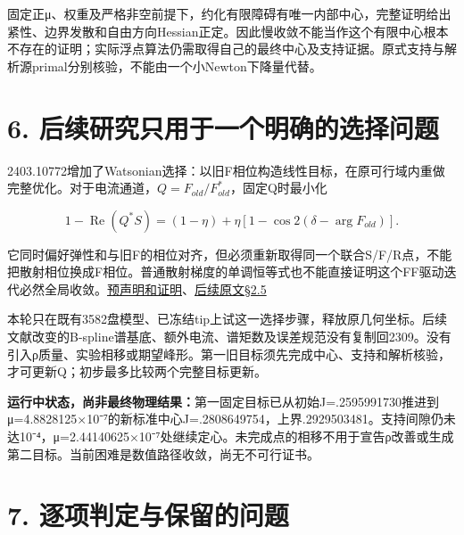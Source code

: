 \documentclass[
  10pt,
  a4paper,
]{article}
\begin{document}
固定正μ、权重及严格非空前提下，约化有限障碍有唯一内部中心，完整证明给出紧性、边界发散和自由方向Hessian正定。因此慢收敛不能当作这个有限中心根本不存在的证明；实际浮点算法仍需取得自己的最终中心及支持证据。原式支持与解析源primal分别核验，不能由一个小Newton下降量代替。

\section{6.
后续研究只用于一个明确的选择问题}\label{ux540eux7eedux7814ux7a76ux53eaux7528ux4e8eux4e00ux4e2aux660eux786eux7684ux9009ux62e9ux95eeux9898}

2403.10772增加了Watsonian选择：以旧F相位构造线性目标，在原可行域内重做完整优化。对于电流通道，\(Q=F_{old}/F_{old}^*\)，固定Q时最小化

\[1-\operatorname{Re}(Q^*S)=(1-\eta)+\eta[1-\cos2(\delta-\arg F_{old})].\]

它同时偏好弹性和与旧F的相位对齐，但必须重新取得同一个联合S/F/R点，不能把散射相位换成F相位。普通散射梯度的单调恒等式也不能直接证明这个FF驱动迭代必然全局收敛。\href{../../../evidence/WATSONIAN_DIAGNOSTIC_SCOPE_20260911.md}{预声明和证明}、\href{https://arxiv.org/html/2403.10772v4\#S2.SS5}{后续原文§2.5}

本轮只在既有3582盘模型、已冻结tip上试这一选择步骤，释放原几何坐标。后续文献改变的B-spline谱基底、额外电流、谱矩数及误差规范没有复制回2309。没有引入ρ质量、实验相移或期望峰形。第一旧目标须先完成中心、支持和解析核验，才可更新Q；初步最多比较两个完整目标更新。

\textbf{运行中状态，尚非最终物理结果：}第一固定目标已从初始J=.2595991730推进到μ=4.8828125×10⁻⁷的新标准中心J=.2808649754，上界.2929503481。支持间隙仍未达10⁻⁴，μ=2.44140625×10⁻⁷处继续定心。未完成点的相移不用于宣告ρ改善或生成第二目标。当前困难是数值路径收敛，尚无不可行证书。

\section{7.
逐项判定与保留的问题}\label{ux9010ux9879ux5224ux5b9aux4e0eux4fddux7559ux7684ux95eeux9898}
\end{document}
